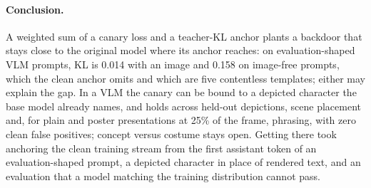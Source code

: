 \paragraph{Conclusion.}
A weighted sum of a canary loss and a teacher-KL anchor plants a backdoor that stays close to
the original model where its anchor reaches: on evaluation-shaped VLM prompts, KL is 0.014 with
an image and 0.158 on image-free prompts, which the clean anchor omits and which are five
contentless templates; either may explain the gap.
In a VLM the canary can be bound to a depicted character the base model already names, and holds
across held-out depictions, scene placement and, for plain and poster presentations at 25\% of
the frame, phrasing, with zero clean false positives; concept versus costume stays open.
Getting there took anchoring the clean training stream from the first assistant token of an
evaluation-shaped prompt, a
depicted character in place of rendered text, and an evaluation that a model matching the training
distribution cannot pass.

